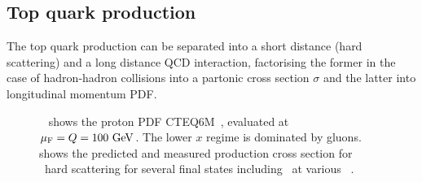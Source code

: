\subsection{Top quark production}
%
The top quark production can be separated into a short distance (hard scattering) and a long distance \gls{QCD} interaction, factorising the former in the case of hadron-hadron collisions into a partonic cross section $\sigma$ and the latter into longitudinal momentum \gls{PDF}. 
%
%
\begin{figure}[tbp!]
\centering
{}
\caption[Proton \gls{PDF} and cross section]{
\Fig~ shows the proton \gls{PDF} CTEQ6M~\cite{Pumplin2002}, evaluated at $\mu_\mathrm{F}=Q=100~\mathrm{GeV}$. The lower $x$ regime is dominated by gluons.
%
\Fig~ shows the predicted and measured production cross section for \pp\ hard scattering for several final states including \ttbar\ at various \cmes~\cite{ATLASSMSummaryPlots}.
%
\label{fig:pdfxsec}}
\end{figure}
